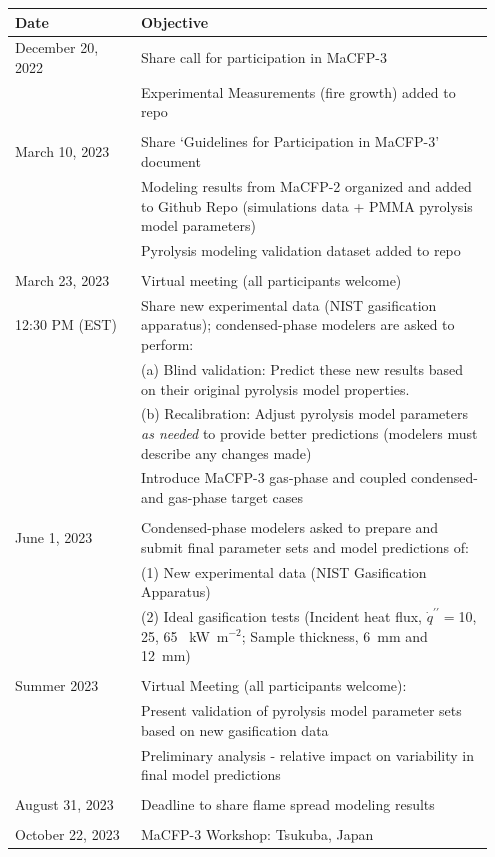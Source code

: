 \documentclass[12pt]{article}
\newcommand{\pp}{\prime\prime}
\begin{document}
\label{Timeline}
\begin{table}[h!]
\begin{tabular}{p{0.25\linewidth} | p{0.7\linewidth}}
\hline
\textbf{Date}          & \textbf{Objective} \\
\hline
December 20, 2022      & Share call for participation in MaCFP-3\\
                       & Experimental Measurements (fire growth) added to repo\\
\\
March 10, 2023          & Share `Guidelines for Participation in MaCFP-3' document \\
                       & Modeling results from MaCFP-2 organized and added to Github Repo (simulations data + PMMA pyrolysis model parameters)\\
                       & Pyrolysis modeling validation dataset added to repo\\
\\
March 23, 2023         & Virtual meeting (all participants welcome)\\
12:30 PM (EST)         & Share new experimental data (NIST gasification apparatus); condensed-phase modelers are asked to perform:\\
                       & (a) Blind validation: Predict these new results based on their original pyrolysis model properties. \\
                       & (b) Recalibration: Adjust pyrolysis model parameters \textit{as needed} to provide better predictions (modelers must describe any changes made)\\
                       & Introduce MaCFP-3 gas-phase and coupled condensed- and gas-phase target cases\\
\\
June 1, 2023           & Condensed-phase modelers asked to prepare and submit final parameter sets and model predictions of: \\
                       & (1) New experimental data (NIST Gasification Apparatus)\\
                       & (2) Ideal gasification tests (Incident heat flux, $\dot{q}^{\pp}=$10, 25, 65 ~kW~m$^{-2}$; Sample thickness, 6~mm and 12~mm)\\
\\
Summer 2023           & Virtual Meeting  (all participants welcome):\\
                       & Present validation of pyrolysis model parameter sets based on new gasification data \\
                       & Preliminary analysis - relative impact on variability in final model predictions\\
\\
August 31, 2023        & Deadline to share flame spread modeling results \\ {}\\
October 22, 2023       & MaCFP-3 Workshop: Tsukuba, Japan \\
\hline
\end{tabular}
\end{table}
\end{document}
